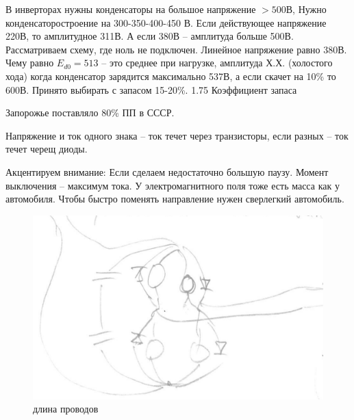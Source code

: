 В инверторах нужны конденсаторы на большое напряжение $>500$В, Нужно конденсаторостроение
на 300-350-400-450 В. Если действующее напряжение 220В, то амплитудное 311В. А если 380В --
амплитуда больше 500В. Рассматриваем схему, где ноль не подключен.
Линейное напряжение равно 380В. Чему равно $E_{d0}=513$ -- это среднее при нагрузке,
амплитуда Х.Х. (холостого хода) когда конденсатор зарядится максимально 537В, а если скачет на 10\%
то 600В. Принято выбирать с запасом 15-20\%. 1.75 Коэффициент запаса

Запорожье поставляло 80\% ПП в СССР.


Напряжение и ток одного знака -- ток течет через транзисторы, если разных -- ток течет черещ диоды.

Акцентируем внимание: Если сделаем недостаточно большую паузу. Момент выключения --
максимум тока. У электромагнитного поля тоже есть масса как у автомобиля. Чтобы быстро 
поменять направление нужен сверлегкий автомобиль.
\begin{figure}[ht!]
\includegraphics[scale=0.2]{real_lection12b1.png}
	\caption{длина проводов}
\end{figure}

